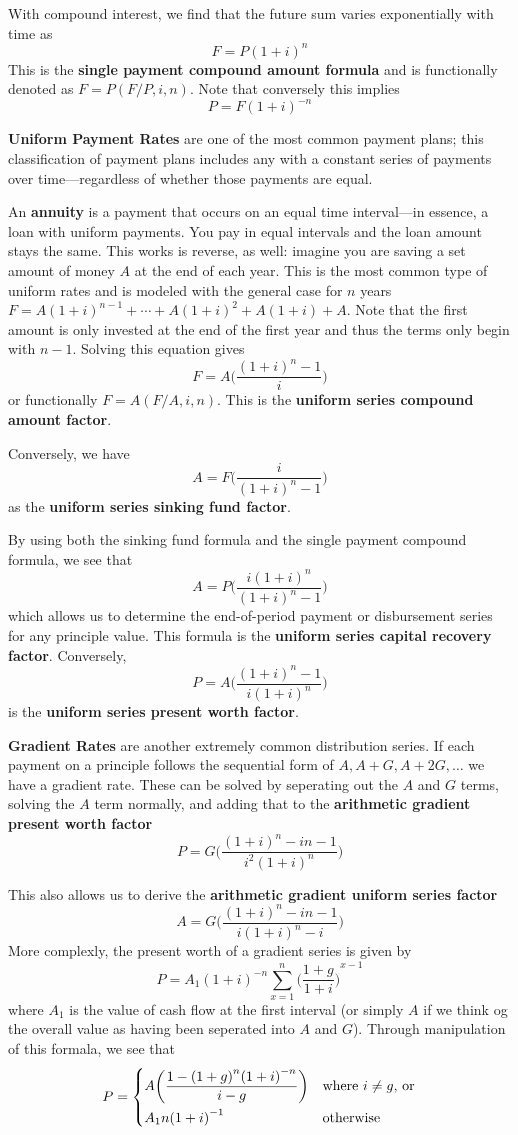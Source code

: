\documentclass[12pt]{article}
\begin{document}

With compound interest, we find that the future sum varies exponentially with time as \[ F = P{(1 + i)}^n \] This is the {\bf single payment compound amount formula} and is functionally denoted as $F = P(F/P, i, n)$. Note that conversely this implies \[ P = F{(1 + i)}^{-n} \]

{\bf Uniform Payment Rates} are one of the most common payment plans; this classification of payment plans includes any with a constant series of payments over time---regardless of whether those payments are equal.

An {\bf annuity} is a payment that occurs on an equal time interval---in essence, a loan with uniform payments. You pay in equal intervals and the loan amount stays the same. This works is reverse, as well: imagine you are saving a set amount of money $A$ at the end of each year. This is the most common type of uniform rates and is modeled with the general case for $n$ years $F = A{(1 + i)}^{n-1} + \cdots + A{(1 + i)}^2 + A{(1 + i)} + A$. Note that the first amount is only invested at the end of the first year and thus the terms only begin with $n-1$. Solving this equation gives \[ F = A \bigg( \frac{{(1 + i)}^n - 1}{i} \bigg) \] or functionally $F = A(F / A, i, n)$. This is the {\bf uniform series compound amount factor}.

Conversely, we have \[ A = F\bigg( \frac{i}{{(1 + i)}^n - 1} \bigg) \] as the {\bf uniform series sinking fund factor}.

By using both the sinking fund formula and the single payment compound formula, we see that \[ A = P \bigg( \frac{i{(1 + i)}^n}{{(1 + i)}^n - 1} \bigg) \] which allows us to determine the end-of-period payment or disbursement series for any principle value. This formula is the {\bf uniform series capital recovery factor}. Conversely, \[ P = A \bigg( \frac{{(1 + i)}^n - 1}{i{(1 + i)}^n} \bigg) \] is the {\bf uniform series present worth factor}.

{\bf Gradient Rates} are another extremely common distribution series. If each payment on a principle follows the sequential form of $A, A+G, A+2G, \dots$ we have a gradient rate. These can be solved by seperating out the $A$ and $G$ terms, solving the $A$ term normally, and adding that to the {\bf arithmetic gradient present worth factor} \[ P = G \bigg( \frac{{(1 + i)}^n - in - 1}{i^2 {(1 + i)}^n} \bigg) \]

This also allows us to derive the {\bf arithmetic gradient uniform series factor} \[ A = G \bigg( \frac{{(1+i)}^n -in - 1}{i{(1+i)}^n - i} \bigg) \] More complexly, the present worth of a gradient series is given by \[ P = A_1{(1 + i)}^{-n} \sum_{x=1}^n {\bigg( \frac{1+g}{1+i} \bigg)}^{x-1} \] where $A_1$ is the value of cash flow at the first interval (or simply $A$ if we think og the overall value as having been seperated into $A$ and $G$). Through manipulation of this formala, we see that \[ P =
\begin{dcases*}
A \bigg( \frac{1 - {(1+g)}^n {(1 + i)}^{-n}}{i-g} \bigg) & where $i \neq g$, or\\
A_1n{(1+i)}^{-1} & otherwise
\end{dcases*}
\]
\end{document}
